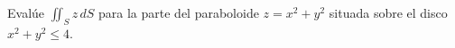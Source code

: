 Evalúe $\iint_S z\,dS$ para la parte del paraboloide $z=x^2+y^2$ situada sobre el disco $x^2+y^2\leq4$.
